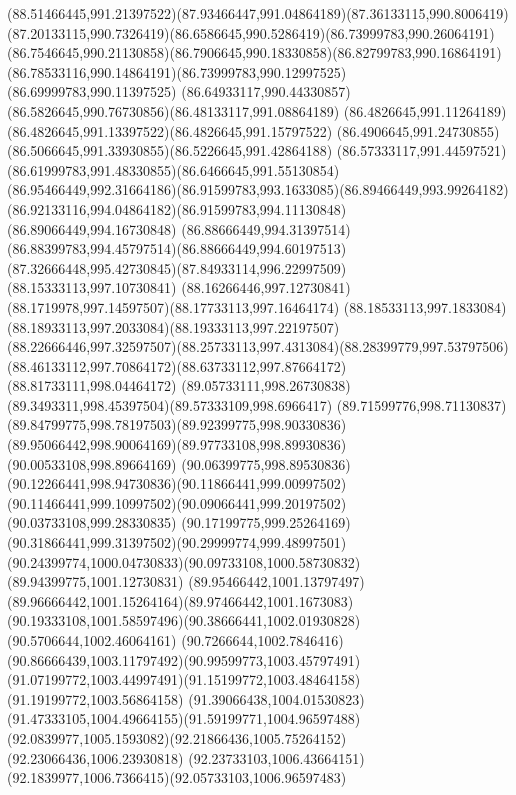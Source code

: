 {{	\curveto(88.51466445,991.21397522)(87.93466447,991.04864189)(87.36133115,990.8006419)
	\curveto(87.20133115,990.7326419)(86.6586645,990.5286419)(86.73999783,990.26064191)
	\curveto(86.7546645,990.21130858)(86.7906645,990.18330858)(86.82799783,990.16864191)
	\curveto(86.78533116,990.14864191)(86.73999783,990.12997525)(86.69999783,990.11397525)
	\curveto(86.64933117,990.44330857)(86.5826645,990.76730856)(86.48133117,991.08864189)
	\curveto(86.4826645,991.11264189)(86.4826645,991.13397522)(86.4826645,991.15797522)
	\curveto(86.4906645,991.24730855)(86.5066645,991.33930855)(86.5226645,991.42864188)
	\curveto(86.57333117,991.44597521)(86.61999783,991.48330855)(86.6466645,991.55130854)
	\curveto(86.95466449,992.31664186)(86.91599783,993.1633085)(86.89466449,993.99264182)
	\curveto(86.92133116,994.04864182)(86.91599783,994.11130848)(86.89066449,994.16730848)
	\curveto(86.88666449,994.31397514)(86.88399783,994.45797514)(86.88666449,994.60197513)
	\curveto(87.32666448,995.42730845)(87.84933114,996.22997509)(88.15333113,997.10730841)
	\curveto(88.16266446,997.12730841)(88.1719978,997.14597507)(88.17733113,997.16464174)
	\curveto(88.18533113,997.1833084)(88.18933113,997.2033084)(88.19333113,997.22197507)
	\curveto(88.22666446,997.32597507)(88.25733113,997.4313084)(88.28399779,997.53797506)
	\curveto(88.46133112,997.70864172)(88.63733112,997.87664172)(88.81733111,998.04464172)
	\curveto(89.05733111,998.26730838)(89.3493311,998.45397504)(89.57333109,998.6966417)
	\curveto(89.71599776,998.71130837)(89.84799775,998.78197503)(89.92399775,998.90330836)
	\curveto(89.95066442,998.90064169)(89.97733108,998.89930836)(90.00533108,998.89664169)
	\curveto(90.06399775,998.89530836)(90.12266441,998.94730836)(90.11866441,999.00997502)
	\curveto(90.11466441,999.10997502)(90.09066441,999.20197502)(90.03733108,999.28330835)
	\curveto(90.17199775,999.25264169)(90.31866441,999.31397502)(90.29999774,999.48997501)
	\curveto(90.24399774,1000.04730833)(90.09733108,1000.58730832)(89.94399775,1001.12730831)
	\curveto(89.95466442,1001.13797497)(89.96666442,1001.15264164)(89.97466442,1001.1673083)
	\curveto(90.19333108,1001.58597496)(90.38666441,1002.01930828)(90.5706644,1002.46064161)
	\curveto(90.7266644,1002.7846416)(90.86666439,1003.11797492)(90.99599773,1003.45797491)
	\curveto(91.07199772,1003.44997491)(91.15199772,1003.48464158)(91.19199772,1003.56864158)
	\curveto(91.39066438,1004.01530823)(91.47333105,1004.49664155)(91.59199771,1004.96597488)
	\curveto(92.0839977,1005.1593082)(92.21866436,1005.75264152)(92.23066436,1006.23930818)
	\curveto(92.23733103,1006.43664151)(92.1839977,1006.7366415)(92.05733103,1006.96597483)
}}
